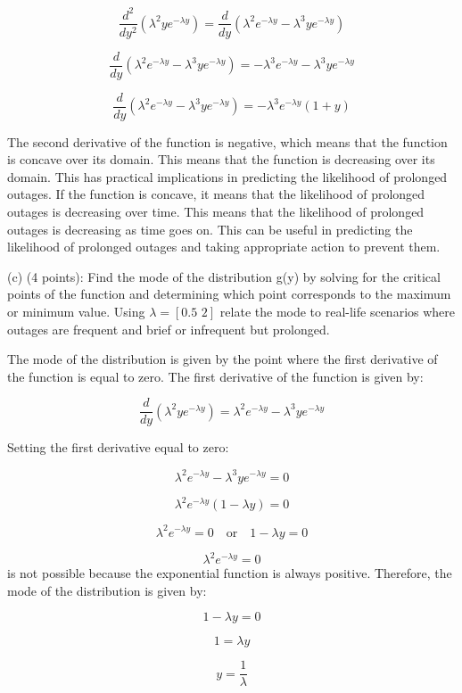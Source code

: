 \documentclass{article}
\begin{document}
\[\frac{d^2}{dy^2}(\lambda^2ye^{-\lambda y}) = \frac{d}{dy}(\lambda^2e^{-\lambda y} - \lambda^3ye^{-\lambda y})\]

\[\frac{d}{dy}(\lambda^2e^{-\lambda y} - \lambda^3ye^{-\lambda y}) = -\lambda^3e^{-\lambda y} - \lambda^3ye^{-\lambda y}\]

\[\frac{d}{dy}(\lambda^2e^{-\lambda y} - \lambda^3ye^{-\lambda y}) = -\lambda^3e^{-\lambda y}(1 + y)\]



The second derivative of the function is negative, which means that the function is concave over its domain. This means that the function is decreasing over its domain. This has practical implications in predicting the likelihood of prolonged outages. If the function is concave, it means that the likelihood of prolonged outages is decreasing over time. This means that the likelihood of prolonged outages is decreasing as time goes on. This can be useful in predicting the likelihood of prolonged outages and taking appropriate action to prevent them.

(c) (4 points): Find the mode of the distribution g(y) by solving for the critical points of the
function and determining which point corresponds to the maximum or minimum value. Using \(\lambda = [\text{0.5 2}]\) relate the mode to real-life scenarios where outages are frequent and brief or infrequent but prolonged.\newline

The mode of the distribution is given by the point where the first derivative of the function is equal to zero. The first derivative of the function is given by:

\[\frac{d}{dy}(\lambda^2ye^{-\lambda y}) = \lambda^2e^{-\lambda y} - \lambda^3ye^{-\lambda y}\]

Setting the first derivative equal to zero:

\[\lambda^2e^{-\lambda y} - \lambda^3ye^{-\lambda y} = 0\]

\[\lambda^2e^{-\lambda y}(1 - \lambda y) = 0\]

\[\lambda^2e^{-\lambda y} = 0 \quad \text{or} \quad 1 - \lambda y = 0\]

\[\lambda^2e^{-\lambda y} = 0\] is not possible because the exponential function is always positive. Therefore, the mode of the distribution is given by:

\[1 - \lambda y = 0\]

\[1 = \lambda y\]

\[y = \frac{1}{\lambda}\]
\end{document}
